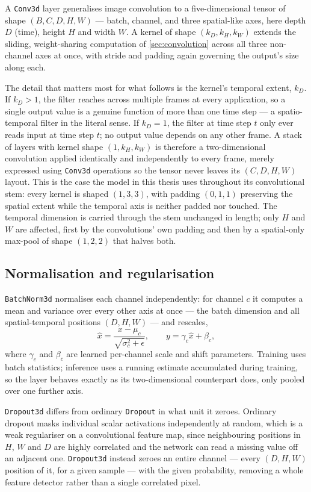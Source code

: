 A \texttt{Conv3d} layer generalises image convolution to a five-dimensional tensor of shape $(B, C, D, H, W)$ --- batch, channel, and three spatial-like axes, here depth $D$ (time), height $H$ and width $W$. A kernel of shape $(k_D, k_H, k_W)$ extends the sliding, weight-sharing computation of \autoref{sec:convolution} across all three non-channel axes at once, with stride and padding again governing the output's size along each.

The detail that matters most for what follows is the kernel's temporal extent, $k_D$. If $k_D > 1$, the filter reaches across multiple frames at every application, so a single output value is a genuine function of more than one time step --- a spatio-temporal filter in the literal sense. If $k_D = 1$, the filter at time step $t$ only ever reads input at time step $t$; no output value depends on any other frame. A stack of layers with kernel shape $(1, k_H, k_W)$ is therefore a two-dimensional convolution applied identically and independently to every frame, merely expressed using \texttt{Conv3d} operations so the tensor never leaves its $(C, D, H, W)$ layout. This is the case the model in this thesis uses throughout its convolutional stem: every kernel is shaped $(1, 3, 3)$, with padding $(0, 1, 1)$ preserving the spatial extent while the temporal axis is neither padded nor touched. The temporal dimension is carried through the stem unchanged in length; only $H$ and $W$ are affected, first by the convolutions' own padding and then by a spatial-only max-pool of shape $(1, 2, 2)$ that halves both.

\subsection{Normalisation and regularisation}
\label{sec:normalisation}

\texttt{BatchNorm3d} normalises each channel independently: for channel $c$ it computes a mean and variance over every other axis at once --- the batch dimension and all spatial-temporal positions $(D, H, W)$ --- and rescales,
\[
	\hat{x} = \frac{x - \mu_c}{\sqrt{\sigma_c^2 + \epsilon}}, \qquad y = \gamma_c \hat{x} + \beta_c,
\]
where $\gamma_c$ and $\beta_c$ are learned per-channel scale and shift parameters. Training uses batch statistics; inference uses a running estimate accumulated during training, so the layer behaves exactly as its two-dimensional counterpart does, only pooled over one further axis.

\texttt{Dropout3d} differs from ordinary \texttt{Dropout} in what unit it zeroes. Ordinary dropout masks individual scalar activations independently at random, which is a weak regulariser on a convolutional feature map, since neighbouring positions in $H$, $W$ and $D$ are highly correlated and the network can read a missing value off an adjacent one. \texttt{Dropout3d} instead zeroes an entire channel --- every $(D, H, W)$ position of it, for a given sample --- with the given probability, removing a whole feature detector rather than a single correlated pixel.

